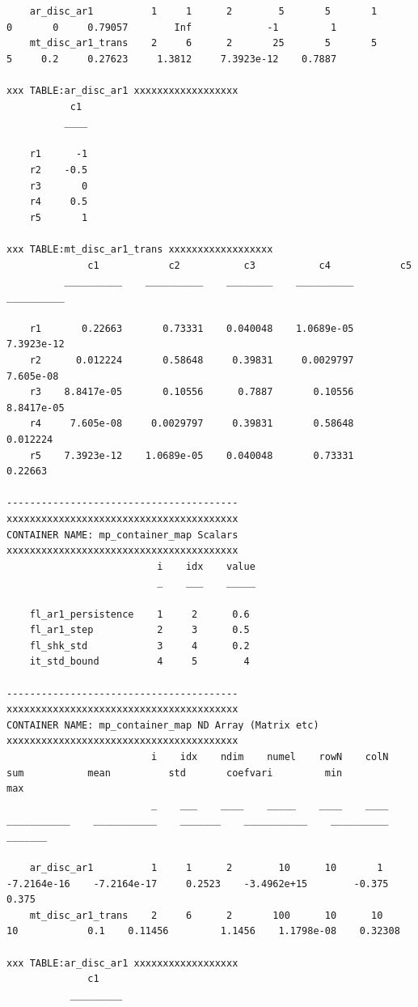 \documentclass[
]{book}
\begin{document}
\begin{verbatim}
    ar_disc_ar1          1     1      2        5       5       1       0       0     0.79057        Inf             -1         1
    mt_disc_ar1_trans    2     6      2       25       5       5       5     0.2     0.27623     1.3812     7.3923e-12    0.7887

xxx TABLE:ar_disc_ar1 xxxxxxxxxxxxxxxxxx
           c1 
          ____

    r1      -1
    r2    -0.5
    r3       0
    r4     0.5
    r5       1

xxx TABLE:mt_disc_ar1_trans xxxxxxxxxxxxxxxxxx
              c1            c2           c3           c4            c5    
          __________    __________    ________    __________    __________

    r1       0.22663       0.73331    0.040048    1.0689e-05    7.3923e-12
    r2      0.012224       0.58648     0.39831     0.0029797     7.605e-08
    r3    8.8417e-05       0.10556      0.7887       0.10556    8.8417e-05
    r4     7.605e-08     0.0029797     0.39831       0.58648      0.012224
    r5    7.3923e-12    1.0689e-05    0.040048       0.73331       0.22663

----------------------------------------
xxxxxxxxxxxxxxxxxxxxxxxxxxxxxxxxxxxxxxxx
CONTAINER NAME: mp_container_map Scalars
xxxxxxxxxxxxxxxxxxxxxxxxxxxxxxxxxxxxxxxx
                          i    idx    value
                          _    ___    _____

    fl_ar1_persistence    1     2      0.6 
    fl_ar1_step           2     3      0.5 
    fl_shk_std            3     4      0.2 
    it_std_bound          4     5        4 

----------------------------------------
xxxxxxxxxxxxxxxxxxxxxxxxxxxxxxxxxxxxxxxx
CONTAINER NAME: mp_container_map ND Array (Matrix etc)
xxxxxxxxxxxxxxxxxxxxxxxxxxxxxxxxxxxxxxxx
                         i    idx    ndim    numel    rowN    colN        sum           mean          std       coefvari         min          max  
                         _    ___    ____    _____    ____    ____    ___________    ___________    _______    ___________    __________    _______

    ar_disc_ar1          1     1      2        10      10       1     -7.2164e-16    -7.2164e-17     0.2523    -3.4962e+15        -0.375      0.375
    mt_disc_ar1_trans    2     6      2       100      10      10              10            0.1    0.11456         1.1456    1.1798e-08    0.32308

xxx TABLE:ar_disc_ar1 xxxxxxxxxxxxxxxxxx
              c1    
           _________


\end{verbatim}
\end{document}
